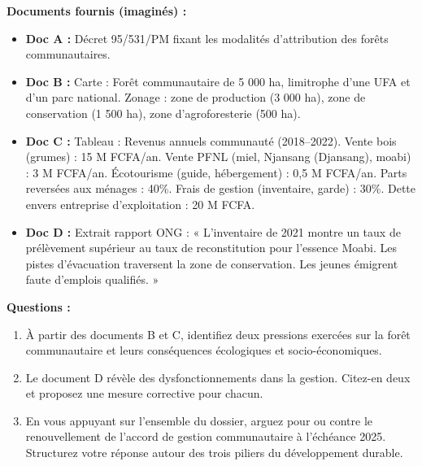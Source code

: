 \documentclass[11pt]{article}
\begin{document}
\begin{exercice}
\textbf{Documents fournis (imaginés) :}
\begin{itemize}
    \item \textbf{Doc A :} Décret 95/531/PM fixant les modalités d'attribution des forêts communautaires.
    \item \textbf{Doc B :} Carte : Forêt communautaire de 5 000 ha, limitrophe d'une UFA et d'un parc national. Zonage : zone de production (3 000 ha), zone de conservation (1 500 ha), zone d'agroforesterie (500 ha).
    \item \textbf{Doc C :} Tableau : Revenus annuels communauté (2018–2022). Vente bois (grumes) : 15 M FCFA/an. Vente PFNL (miel, Njansang (Djansang), moabi) : 3 M FCFA/an. Écotourisme (guide, hébergement) : 0,5 M FCFA/an. Parts reversées aux ménages : 40\%. Frais de gestion (inventaire, garde) : 30\%. Dette envers entreprise d'exploitation : 20 M FCFA.
    \item \textbf{Doc D :} Extrait rapport ONG : « L'inventaire de 2021 montre un taux de prélèvement supérieur au taux de reconstitution pour l'essence Moabi. Les pistes d'évacuation traversent la zone de conservation. Les jeunes émigrent faute d'emplois qualifiés. »
\end{itemize}
\textbf{Questions :}
\begin{enumerate}
    \item À partir des documents B et C, identifiez deux pressions exercées sur la forêt communautaire et leurs conséquences écologiques et socio-économiques.
    \item Le document D révèle des dysfonctionnements dans la gestion. Citez-en deux et proposez une mesure corrective pour chacun.
    \item En vous appuyant sur l'ensemble du dossier, arguez pour ou contre le renouvellement de l'accord de gestion communautaire à l'échéance 2025. Structurez votre réponse autour des trois piliers du développement durable.
\end{enumerate}
\end{exercice}
\end{document}
